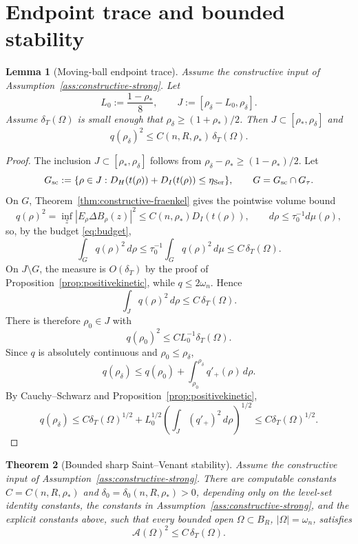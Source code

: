 \documentclass[11pt]{amsart}
\newtheorem{theorem}{Theorem}[section]
\newtheorem{lemma}[theorem]{Lemma}
\theoremstyle{definition}
\newcommand{\Om}{\Omega}
\newcommand{\Fr}{\mathcal A}
\newcommand{\dT}{\delta_T}
\newcommand{\rstar}{\rho_*}
\newcommand{\rdel}{\rho_\delta}
\begin{document}
\section{Endpoint trace and bounded stability}\label{sec:endpoint}

\begin{lemma}[Moving-ball endpoint trace]
\label{lem:endpoint}
Assume the constructive input of Assumption~\ref{ass:constructive-strong}.  Let
\[
   L_0:=\frac{1-\rstar}{8},\qquad
   J:=[\rdel-L_0,\rdel].
\]
Assume \(\dT(\Om)\) is small enough that
\(\rdel\ge(1+\rstar)/2\).  Then \(J\subset[\rstar,\rdel]\) and
\[
   q(\rdel)^2\le C(n,R,\rstar)\,\dT(\Om).
\]
\end{lemma}

\begin{proof}
The inclusion \(J\subset[\rstar,\rdel]\) follows from
\(\rdel-\rstar\ge(1-\rstar)/2\).  Let
\[
   G_{\rm sc}:=\{\rho\in J:
      D_H(t(\rho))+D_I(t(\rho))\le\eta_{\rm Ser}\},
   \qquad G=G_{\rm sc}\cap G_\tau .
\]
On \(G\), Theorem~\ref{thm:constructive-fraenkel} gives the pointwise volume
bound
\[
   q(\rho)^2=\inf_z|E_\rho\Delta B_\rho(z)|^2\le C(n,\rstar)D_I(t(\rho)),
   \qquad d\rho\le\tau_0^{-1}d\mu(\rho),
\]
so, by the budget \eqref{eq:budget},
\[
   \int_G q(\rho)^2\,d\rho\le\tau_0^{-1}\!\int_G q(\rho)^2\,d\mu\le C\,\dT(\Om).
\]
On \(J\setminus G\), the measure is \(O(\dT)\) by the proof of
Proposition~\ref{prop:positivekinetic}, while \(q\le2\omega_n\).  Hence
\[
   \int_J q(\rho)^2\,d\rho\le C\,\dT(\Om).
\]
There is therefore \(\rho_0\in J\) with
\[
   q(\rho_0)^2\le C L_0^{-1}\dT(\Om).
\]
Since \(q\) is absolutely continuous and \(\rho_0\le\rdel\),
\[
   q(\rdel)
   \le q(\rho_0)+\int_{\rho_0}^{\rdel}q'_+(\rho)\,d\rho.
\]
By Cauchy--Schwarz and Proposition~\ref{prop:positivekinetic},
\[
   q(\rdel)
   \le C\dT(\Om)^{1/2}
      +L_0^{1/2}\left(\int_J(q'_+)^2\,d\rho\right)^{1/2}
   \le C\dT(\Om)^{1/2}.
\]
\end{proof}

\begin{theorem}[Bounded sharp Saint--Venant stability]
\label{thm:boundedSV}
Assume the constructive input of Assumption~\ref{ass:constructive-strong}.
There are computable constants \(C=C(n,R,\rstar)\) and
\(\delta_0=\delta_0(n,R,\rstar)>0\), depending only on the level-set
identity constants, the constants in Assumption~\ref{ass:constructive-strong},
and the explicit constants above, such that every bounded open \(\Om\subset B_R\),
\(|\Om|=\omega_n\), satisfies
\[
   \Fr(\Om)^2\le C\,\dT(\Om).
\]
\end{theorem}
\end{document}
